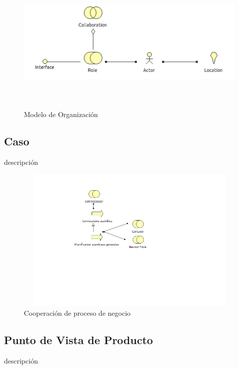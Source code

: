 \begin{figure}[th!]
	\centering
	\includegraphics[width=12cm,height=7cm]{arquitectura/negocio/imgs/m_organizacion}
	\caption{Modelo de Organización}
\end{figure}

\newpage
\subsection{Caso}
descripción

\begin{figure}[th!]
	\centering
	\includegraphics[width=12cm,height=7cm]{arquitectura/negocio/imgs/cooperacion-proceso}
	\caption{Cooperación de proceso de negocio}
\end{figure}
\newpage

\subsection{Punto de Vista de Producto}
descripción


